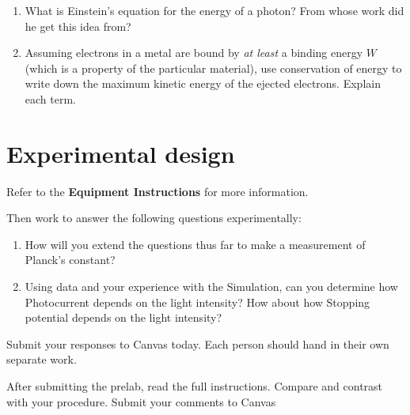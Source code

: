 \documentclass{tufte-handout}
\begin{document}
\begin{enumerate}
\item What is Einstein's equation for the energy of a photon?  From whose work did he get this idea from?

\item \label{q-energycons} Assuming electrons in a metal are bound by {\em at least} a binding energy $W$ (which is a property of the particular material), use conservation of energy to write down the maximum kinetic energy of the ejected electrons.  Explain each term.



\end{enumerate}


\section{Experimental design}
Refer to the {\bf Equipment Instructions} for more information.

Then work to answer the following questions experimentally:

\begin{enumerate}
    \item How will you extend the questions thus far to make a measurement of Planck’s constant?

    \item Using data and your experience with the Simulation, can you determine how Photocurrent depends
on the light intensity? How about how Stopping potential depends on the light intensity?
\end{enumerate}

Submit your responses to Canvas today.  Each person should hand in their own separate work.

After submitting the prelab, read the full instructions. Compare and contrast with your procedure.
Submit your comments to Canvas
\end{document}
